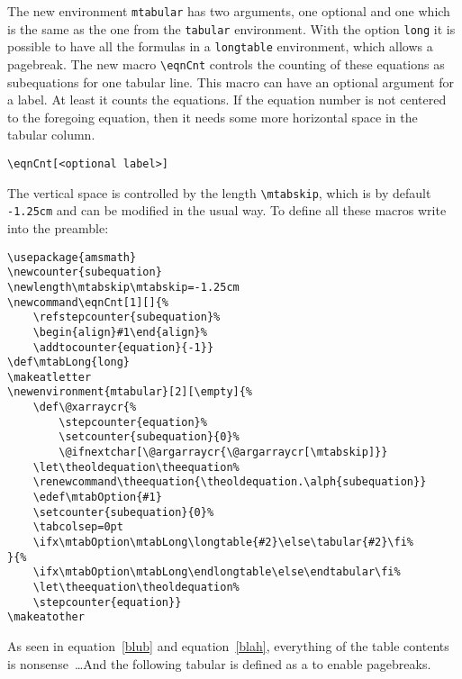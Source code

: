 \begin{table}[htb]
The new environment \verb|mtabular| has two arguments, one optional and one which is the same
as the one from the \verb|tabular| environment. With the option \verb|long| it is possible to have    %
all the formulas in a \verb|longtable| environment, which allows a pagebreak. The new macro
\verb|\eqnCnt| controls the counting of these equations as subequations for one tabular
line. This macro can have an optional argument for a label. At least it counts 
the equations. If the
equation number is not centered to the foregoing equation, then it needs some more horizontal
space in the tabular column.

\begin{verbatim}
\eqnCnt[<optional label>]
\end{verbatim}

The vertical space is controlled by the length \verb|\mtabskip|, which 
is by default \verb|-1.25cm| and can be modified in the usual way.
To define all these macros write into the preamble:

\begin{lstlisting}[tabsize=4]
\usepackage{amsmath}
\newcounter{subequation}
\newlength\mtabskip\mtabskip=-1.25cm
\newcommand\eqnCnt[1][]{%
	\refstepcounter{subequation}%
	\begin{align}#1\end{align}%
	\addtocounter{equation}{-1}}
\def\mtabLong{long}
\makeatletter
\newenvironment{mtabular}[2][\empty]{%
	\def\@xarraycr{%
		\stepcounter{equation}%
		\setcounter{subequation}{0}%
		\@ifnextchar[\@argarraycr{\@argarraycr[\mtabskip]}}
	\let\theoldequation\theequation%
	\renewcommand\theequation{\theoldequation.\alph{subequation}}
	\edef\mtabOption{#1}
	\setcounter{subequation}{0}%
	\tabcolsep=0pt
	\ifx\mtabOption\mtabLong\longtable{#2}\else\tabular{#2}\fi%
}{%
	\ifx\mtabOption\mtabLong\endlongtable\else\endtabular\fi%
	\let\theequation\theoldequation%
	\stepcounter{equation}}
\makeatother
\end{lstlisting}


As seen in equation~\ref{blub} and equation~\ref{blah}, everything of the table contents is 
nonsense~\ldots And the following tabular is defined as a  to enable pagebreaks.



\end{table}
